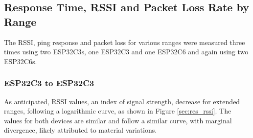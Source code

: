 \subsection{\label{sec:res_rssi}Response Time, RSSI and Packet Loss Rate by Range}

The RSSI, ping response and packet loss for various ranges were measured three times using two ESP32C3s, one ESP32C3 and one ESP32C6 and again using two ESP32C6s.

\subsubsection{ESP32C3 to ESP32C3}

As anticipated, RSSI values, an index of signal strength, decrease for extended ranges, following a logarithmic curve, as shown in Figure \ref{sec:res_rssi}. The values for both devices are similar and follow a similar curve, with marginal divergence, likely attributed to material variations.

